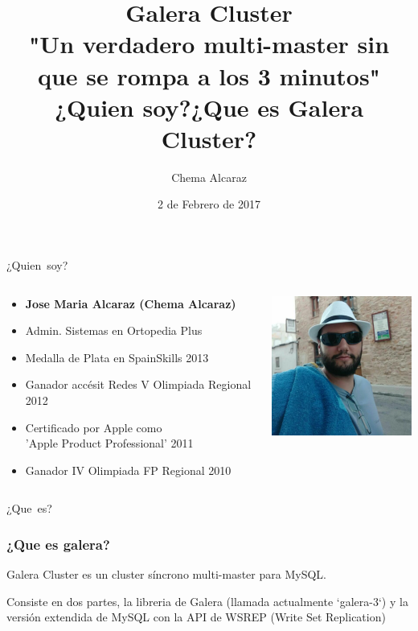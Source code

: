 \documentclass[UTF8]{beamer}
\title[Portada]{
	Galera Cluster \\
	\large "Un verdadero multi-master sin que se rompa a los 3 minutos"\\
}
\author{Chema Alcaraz}
\date{2 de Febrero de 2017}
\begin{document}
	
\begin{frame}
	\titlepage
\end{frame}

\title{¿Quien soy?}

\begin{frame}
	\centering
	\mbox{¿Quien soy?}	
\end{frame}


\begin{frame}
\begin{columns}
    \begin{column}{0.6\textwidth}
        \begin{itemize}
            \item \textbf{Jose Maria Alcaraz (Chema Alcaraz)}
            \item Admin. Sistemas en Ortopedia Plus
            \item Medalla de Plata en SpainSkills 2013
			\item Ganador accésit Redes V Olimpiada Regional 2012
			\item Certificado por Apple como \\'Apple Product Professional' 2011
            \item Ganador IV Olimpiada FP Regional 2010
        \end{itemize}
    \end{column}
    \begin{column}{0.40\textwidth}
        \includegraphics[width=5cm]{images/yo}
    \end{column}
\end{columns}
	
\end{frame}


\title{¿Que es Galera Cluster?}

\begin{frame}
	\centering
	\mbox{¿Que es?}	
\end{frame}


\begin{frame}
	\frametitle{¿Que es galera?}
	\begin{framed}
		Galera Cluster es un cluster síncrono multi-master para MySQL.
	\end{framed}
	\pause
	\begin{framed}
		Consiste en dos partes, la libreria de Galera (llamada actualmente `galera-3`) y la versión extendida de MySQL con la API de WSREP (Write Set Replication)
	\end{framed}
\end{frame}
\end{document}
